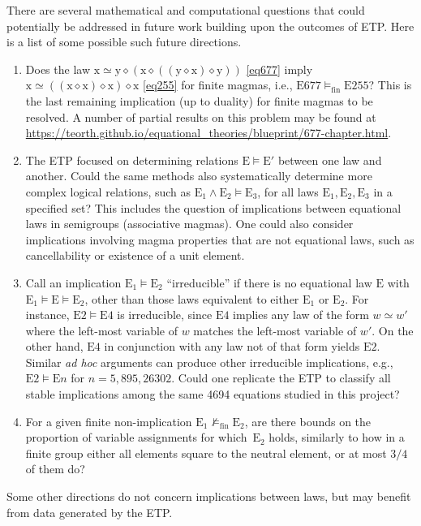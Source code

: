 \documentclass[12pt]{amsart}
\theoremstyle{definition}
\newcommand{\x}{\mathrm{x}}
\newcommand{\y}{\mathrm{y}}
\newcommand{\op}{\diamond}
\newcommand{\formaleq}{\simeq}
\newcommand{\nmodels}{\not\models}
\newcommand{\modelsfin}{\models_{\mathrm{fin}}}
\newcommand{\nmodelsfin}{\nmodels_{\mathrm{fin}}}
\newcommand{\Eq}[1]{\mathrm{E}#1}
\newcommand{\E}{\mathrm{E}}
\begin{document}
There are several mathematical and computational questions that could potentially be addressed in future work building upon the outcomes of ETP\@.
Here is a list of some possible such future directions.
\begin{enumerate}
  \item Does the law $\x \formaleq \y \op (\x \op ((\y \op \x) \op \y))$ \eqref{eq677} imply $\x \formaleq ((\x \op \x) \op \x) \op \x$ \eqref{eq255} for finite magmas, i.e., $\Eq{677} \modelsfin \Eq{255}$? This is the last remaining implication (up to duality) for finite magmas to be resolved.  A number of partial results on this problem may be found at \url{https://teorth.github.io/equational_theories/blueprint/677-chapter.html}.

  \item The ETP focused on determining relations $\E \models \E'$ between one law and another.  Could the same methods also systematically determine more complex logical relations, such as $\E_1 \wedge \E_2 \models \E_3$, for all laws $\E_1,\E_2,\E_3$ in a specified set?  This includes the question of implications between equational laws in semigroups (associative magmas).  One could also consider implications involving magma properties that are not equational laws, such as cancellability or existence of a unit element.

  \item Call an implication $\E_1 \models \E_2$ ``irreducible'' if there is no equational law $\E$ with $\E_1 \models \E \models \E_2$, other than those laws equivalent to either $\E_1$ or $\E_2$.  For instance, $\Eq{2} \models \Eq{4}$ is irreducible, since $\Eq{4}$ implies any law of the form $w \formaleq w'$ where the left-most variable of $w$ matches the left-most variable of $w'$. On the other hand, $\Eq{4}$ in conjunction with any law not of that form yields $\Eq{2}$.  Similar \emph{ad hoc} arguments can produce other irreducible implications, e.g., $\Eq{2} \models \Eq{n}$ for $n = 5, 895, 26302$.  Could one replicate the ETP to classify all stable implications among the same \num{4694} equations studied in this project?

  \item For a given finite non-implication $\E_1 \nmodelsfin \E_2$, are there bounds on the proportion of variable assignments for which~$\E_2$ holds, similarly to how in a finite group either all elements square to the neutral element, or at most $3/4$ of them do?
\end{enumerate}
Some other directions do not concern implications between laws, but may benefit from data generated by the ETP\@.
\end{document}
